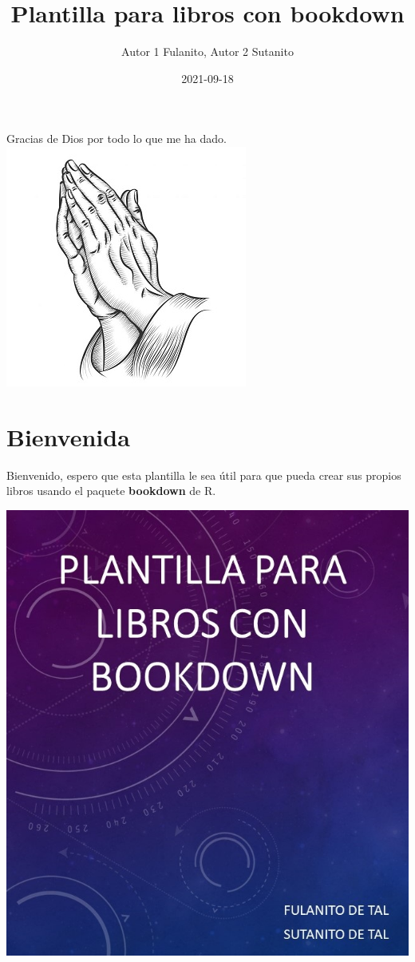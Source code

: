 \documentclass[
]{krantz}
\title{Plantilla para libros con bookdown}
\author{Autor 1 Fulanito, Autor 2 Sutanito}
\date{2021-09-18}
\begin{document}
\maketitle


\thispagestyle{empty}

\begin{center}
	Gracias de Dios por todo lo que me ha dado.
	\includegraphics{images/dedication.jpg}
\end{center}

\setlength{\abovedisplayskip}{-5pt}
\setlength{\abovedisplayshortskip}{-5pt}

{
\hypersetup{linkcolor=}
\setcounter{tocdepth}{2}
\tableofcontents
}
\listoffigures
\listoftables
\hypertarget{bienvenida}{%
\chapter*{Bienvenida}\label{bienvenida}}


Bienvenido, espero que esta plantilla le sea útil para que pueda crear sus propios libros usando el paquete \textbf{bookdown} \citep{R-bookdown} de R.

\begin{center}\includegraphics[width=0.5\linewidth]{images/cover} \end{center}
\end{document}
